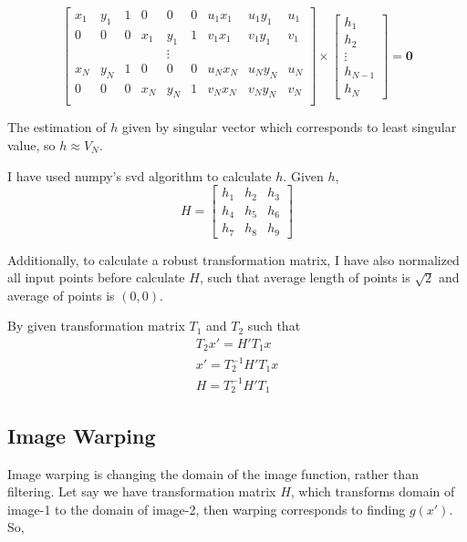 \documentclass[12pt]{article}
\begin{document}
\begin{equation*}
    \left[ \begin{array}{ccccccccc}
         x_1 & y_1 & 1 & 0 & 0 & 0 & u_1 x_1 & u_1 y_1 & u_1  \\ 
         0 & 0 & 0 & x_1 & y_1 & 1 & v_1 x_1 & v_1 y_1 & v_1  \\
          &  &  &  & \vdots &  &  &  & \\
         x_N & y_N & 1 & 0 & 0 & 0 & u_N x_N & u_N y_N & u_N  \\ 
         0 & 0 & 0 & x_N & y_N & 1 & v_N x_N & v_N y_N & v_N  \\     
    \end{array} \right] \times \left[ \begin{array}{c}
         h_1 \\
         h_2 \\
         \vdots \\
         h_{N-1} \\
         h_N
    \end{array}\right] = \mathbf{0}
\end{equation*}

The estimation of $h$ given by singular vector which corresponds to least singular value, so $h \approx V_N$.

I have used numpy's svd algorithm to calculate $h$. Given $h$,
\begin{equation*}
    H = \left[ \begin{array}{ccc}
         h_1 & h_2 & h_3 \\
         h_4 & h_5 & h_6 \\
         h_7 & h_8 & h_9
    \end{array}\right]
\end{equation*}

Additionally, to calculate a robust transformation matrix, I have also normalized all input points before calculate $H$, such that average length of points is $\sqrt{2}$ and average of points is $(0, 0)$.

By given transformation matrix $T_1$ and $T_2$ such that
\begin{align*}
    T_2 x' = H' T_1 x \\
    x' = T_2^{-1} H' T_1 x \\
    H = T_2^{-1} H' T_1
\end{align*}

\subsection{Image Warping}
Image warping is changing the domain of the image function, rather than filtering. Let say we have transformation matrix $H$, which transforms domain of image-1 to the domain of image-2, then warping corresponds to finding $g(x')$. So,
\end{document}

